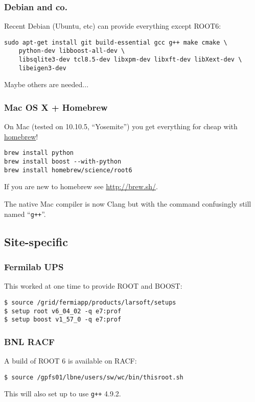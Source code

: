 \documentclass[xcolor=dvipsnames]{beamer}
\begin{document}
\begin{frame}[fragile]
  \frametitle{Debian and co.}

  Recent Debian (Ubuntu, etc) can provide everything except ROOT6:
\begin{verbatim}
sudo apt-get install git build-essential gcc g++ make cmake \
    python-dev libboost-all-dev \
    libsqlite3-dev tcl8.5-dev libxpm-dev libxft-dev libXext-dev \
    libeigen3-dev
\end{verbatim}
  Maybe others are needed...
\end{frame}

\begin{frame}[fragile]
  \frametitle{Mac OS X + Homebrew}
  On Mac (tested on 10.10.5, ``Yosemite'') you get everything for cheap with \href{http://brew.sh/}{homebrew}!
\begin{verbatim}
brew install python
brew install boost --with-python
brew install homebrew/science/root6
\end{verbatim}

  If you are new to homebrew see \url{http://brew.sh/}.

  The native Mac compiler is now Clang but with the command confusingly still named ``\texttt{g++}''.


\end{frame}

\subsection{Site-specific}

\begin{frame}[fragile]
  \frametitle{Fermilab UPS}
  This worked at one time to provide ROOT and BOOST:
\begin{verbatim}
$ source /grid/fermiapp/products/larsoft/setups
$ setup root v6_04_02 -q e7:prof
$ setup boost v1_57_0 -q e7:prof
\end{verbatim}

\end{frame}

\begin{frame}[fragile]
  \frametitle{BNL RACF}
  A build of ROOT 6 is available on RACF:

\begin{verbatim}
$ source /gpfs01/lbne/users/sw/wc/bin/thisroot.sh
\end{verbatim}

This will also set up to use \texttt{g++} 4.9.2.

\end{frame}
\end{document}

